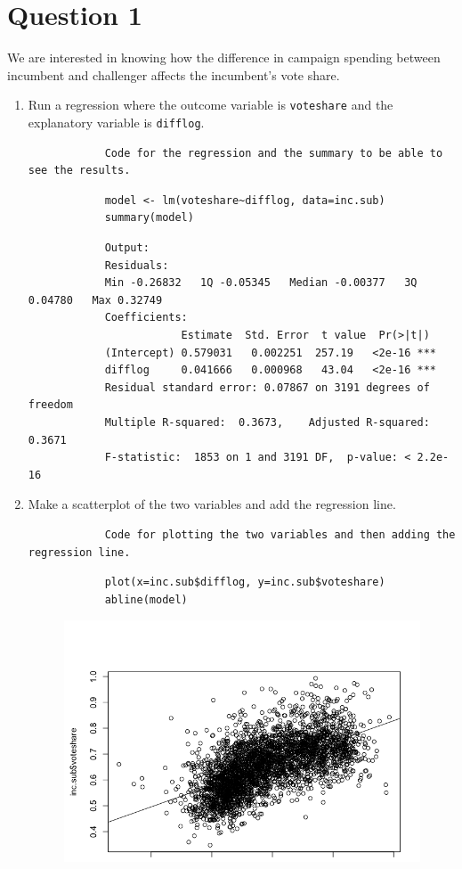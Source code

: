 \documentclass[12pt,letterpaper]{article}
\begin{document}
\section*{Question 1}
\vspace{.25cm}
\noindent We are interested in knowing how the difference in campaign spending between incumbent and challenger affects the incumbent's vote share. 
	\begin{enumerate}
		\item Run a regression where the outcome variable is \texttt{voteshare} and the explanatory variable is \texttt{difflog}.
		\begin{verbatim}
			Code for the regression and the summary to be able to see the results.
		\end{verbatim}
		\begin{lstlisting}
			model <- lm(voteshare~difflog, data=inc.sub)
			summary(model)
	    \end{lstlisting}
		\begin{verbatim}
			Output:
			Residuals:    
			Min -0.26832   1Q -0.05345   Median -0.00377   3Q 0.04780   Max 0.32749 
			Coefficients:           
			            Estimate  Std. Error  t value  Pr(>|t|)    
			(Intercept) 0.579031   0.002251  257.19   <2e-16 ***
			difflog     0.041666   0.000968   43.04   <2e-16 ***
			Residual standard error: 0.07867 on 3191 degrees of freedom
			Multiple R-squared:  0.3673,	Adjusted R-squared:  0.3671 
			F-statistic:  1853 on 1 and 3191 DF,  p-value: < 2.2e-16
		\end{verbatim}
		\item Make a scatterplot of the two variables and add the regression line. 
		\begin{verbatim}
			Code for plotting the two variables and then adding the regression line.
		\end{verbatim}
		\begin{lstlisting}
			plot(x=inc.sub$difflog, y=inc.sub$voteshare)
			abline(model)
		\end{lstlisting}
		\begin{figure}
			\vspace{-1cm}
			\includegraphics[width=15cm]{Rplotex1.png}

\end{figure}
\end{enumerate}
\end{document}

